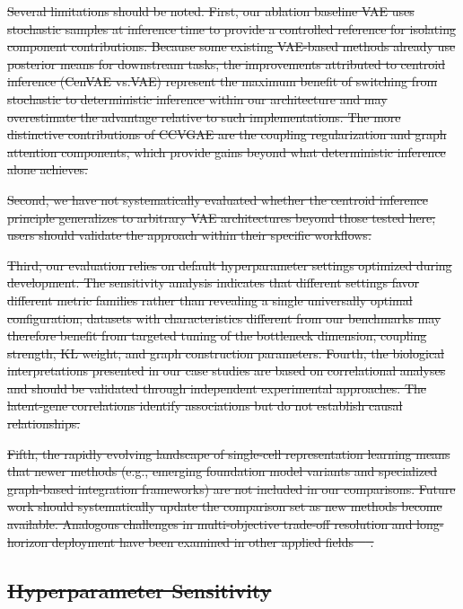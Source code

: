 \documentclass[referee, pdflatex, sn-vancouver-num]{sn-jnl}
\providecommand{\DIFdeltex}[1]{{\protect\color{red}\sout{#1}}}                      %
\providecommand{\DIFdel}[1]{\texorpdfstring{\DIFdeltex{#1}}{}} %
\begin{document}
\DIFdel{Several limitations should be noted. First, our ablation baseline VAE uses stochastic samples at inference time to provide a controlled reference for isolating component contributions. Because some existing VAE-based methods already use posterior means for downstream tasks, the improvements attributed to centroid inference (CenVAE vs.VAE) represent the maximum benefit of switching from stochastic to deterministic inference within our architecture and may overestimate the advantage relative to such implementations. The more distinctive contributions of CCVGAE are the coupling regularization and graph attention components, which provide gains beyond what deterministic inference alone achieves.}%

\DIFdel{Second, we have not systematically evaluated whether the centroid inference principle generalizes to arbitrary VAE architectures beyond those tested here; users should validate the approach within their specific workflows.
}%

\DIFdel{Third, our evaluation relies on default hyperparameter settings optimized during development. The sensitivity analysis indicates that different settings favor different metric families rather than revealing a single universally optimal configuration; datasets with characteristics different from our benchmarks may therefore benefit from targeted tuning of the bottleneck dimension, coupling strength, KL weight, and graph construction parameters.
Fourth, the biological interpretations presented in our case studies are based on correlational analyses and should be validated through independent experimental approaches. The latent-gene correlations identify associations but do not establish causal relationships. }%

\DIFdel{Fifth, the rapidly evolving landscape of single-cell representation learning means that newer methods (e.g., emerging foundation model variants and specialized graph-based integration frameworks) are not included in our comparisons. Future work should systematically update the comparison set as new methods become available. Analogous challenges in multi-objective trade-off resolution and long-horizon deployment have been examined in other applied fields~\mbox{%
\cite{aqlan2025gametheory,aqlan2025conflict,naeem2025pavement,naeem2025labor,naeem2025sustainability}}\hskip0pt%
.
}%

\subsection*{\DIFdel{Hyperparameter Sensitivity}}
\end{document}
